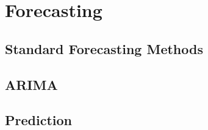 \section{Forecasting}
\subsection{Standard Forecasting Methods}
\subsection{ARIMA}
\subsection{Prediction }
\endinput